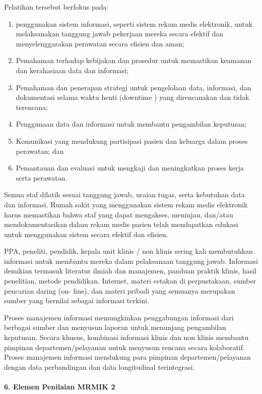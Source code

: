 \documentclass[
]{book}
\providecommand{\tightlist}{%
  \setlength{\itemsep}{0pt}\setlength{\parskip}{0pt}}
\begin{document}
Pelatihan tersebut berfokus pada:

\begin{enumerate}
\def\labelenumi{\alph{enumi}.}
\tightlist
\item
  penggunakan sistem informasi, seperti sistem rekam medis elektronik, untuk melaksanakan tanggung jawab pekerjaan mereka secara efektif dan menyelenggarakan perawatan secara efisien dan aman;
\item
  Pemahaman terhadap kebijakan dan prosedur untuk memastikan keamanan dan kerahasiaan data dan informasi;
\item
  Pemahaman dan penerapan strategi untuk pengelolaan data, informasi, dan dokumentasi selama waktu henti (downtime ) yang direncanakan dan tidak terencana;
\item
  Penggunaan data dan informasi untuk membantu pengambilan keputusan;
\item
  Komunikasi yang mendukung partisipasi pasien dan keluarga dalam proses perawatan; dan
\item
  Pemantauan dan evaluasi untuk mengkaji dan meningkatkan proses kerja serta perawatan.
\end{enumerate}

Semua staf dilatih sesuai tanggung jawab, uraian tugas, serta kebutuhan data dan informasi. Rumah sakit yang menggunakan sistem rekam medis elektronik harus memastikan bahwa staf yang dapat mengakses, meninjau, dan/atau mendokumentasikan dalam rekam medis pasien telah mendapatkan edukasi untuk menggunakan sistem secara efektif dan efisien.

PPA, peneliti, pendidik, kepala unit klinis / non klinis sering kali membutuhkan informasi untuk membantu mereka dalam pelaksanaan tanggung jawab. Informasi demikian termasuk literatur ilmiah dan manajemen, panduan praktik klinis, hasil penelitian, metode pendidikan. Internet, materi cetakan di perpustakaan, sumber pencarian daring (on- line), dan materi pribadi yang semuanya merupakan sumber yang bernilai sebagai informasi terkini.

Proses manajemen informasi memungkinkan penggabungan informasi dari berbagai sumber dan menyusun laporan untuk menunjang pengambilan keputusan. Secara khusus, kombinasi informasi klinis dan non klinis membantu pimpinan departemen/pelayanan untuk menyusun rencana secara kolaboratif. Proses manajemen informasi mendukung para pimpinan departemen/pelayanan dengan data perbandingan dan data longitudinal terintegrasi.

\hypertarget{elemen-penilaian-mrmik-2}{%
\paragraph*{6. Elemen Penilaian MRMIK 2}\label{elemen-penilaian-mrmik-2}}
\end{document}
